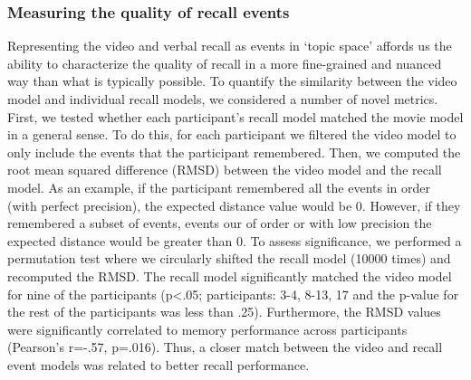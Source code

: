 \documentclass[a4paper,man,natbib,floatsintext]{apa6}
\begin{document}
\subsubsection{Measuring the quality of recall events}
Representing the video and verbal recall as events in `topic space' affords us the ability to characterize the quality of recall in a more fine-grained and nuanced way than what is typically possible. To quantify the similarity between the video model and individual recall models, we considered a number of novel metrics.  First, we tested whether each participant's recall model matched the movie model in a general sense. To do this, for each participant we filtered the video model to only include the events that the participant remembered. Then, we computed the root mean squared difference (RMSD) between the video model and the recall model. As an example, if the participant remembered all the events in order (with perfect precision), the expected distance value would be 0. However, if they remembered a subset of events, events our of order or with low precision the expected distance would be greater than 0. To assess significance, we performed a permutation test where we circularly shifted the recall model (10000 times) and recomputed the RMSD. The recall model significantly matched the video model for nine of the participants (p<.05; participants: 3-4, 8-13, 17 and the p-value for the rest of the participants was less than .25). Furthermore, the RMSD values were significantly correlated to memory performance across participants (Pearson's r=-.57, p=.016). Thus, a closer match between the video and recall event models was related to better recall performance.
\end{document}

